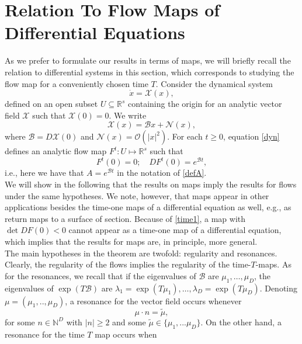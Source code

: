 \documentclass{amsart}
\theoremstyle{plain}
\theoremstyle{definition}
\begin{document}
\section{Relation To Flow Maps of Differential Equations}\label{sec_appendix}
As we prefer to formulate our results in terms of maps, we will briefly recall the relation to differential systems in this section, which corresponds to studying the flow map for a conveniently chosen time $T$. 
Consider the dynamical system
\begin{equation}\label{dynsyst}
\dot{x}=\mathcal{X}(x), 
\end{equation}
defined on an open subset $U\subseteq\mathbb{R}^s$ containing the origin for an analytic vector field $\mathcal{X}$ such that $\mathcal{X}(0)=0$. We write
\begin{equation}\label{dyn}
\mathcal{X}(x)=\mathcal{B}x+\mathcal{N}(x),
\end{equation}
where $\mathcal{B}=D\mathcal{X}(0)$ and $\mathcal{N}(x)=\mathcal{O}(|x|^2)$. For each $t\geq 0$, equation \eqref{dyn} defines an analytic flow map $F^t:U\mapsto \mathbb{R}^s$ such that
\begin{equation}\label{time1} 
 F^t(0) = 0; \quad DF^t(0)=e^{\mathcal{B}t},
\end{equation}
i.e., here we have that $A=e^{\mathcal{B}t}$ in the notation of \eqref{defA}.\\
We will show in the following that the results on maps imply the results for flows under the same hypotheses. We note, however, that maps appear in other applications besides the time-one maps of a differential equation as well, e.g., as return maps to a surface of section. Because of \eqref{time1}, a map with $\det DF(0) < 0$ cannot appear as a time-one map of a differential equation, which implies that the results for maps are, in principle, more general.\\
The main hypotheses in the theorem are twofold: regularity and resonances. Clearly, the regularity of the flows implies the regularity of the time-$T$-maps. As for the resonances, we recall that if  the eigenvalues of $\mathcal{B}$ are $\mu_1, \ldots, \mu_D$, the eigenvalues of $\exp( T \mathcal{B})$ are $\lambda_1 = \exp(T \mu_1), \ldots, \lambda_D = \exp(T\mu_D)$. Denoting $\mu=(\mu_1,..,\mu_D)$, a resonance for the vector field occurs whenever
\begin{equation} \label{flowresonance} 
\mu \cdot n  = \tilde \mu,  
\end{equation}
for some $n \in \mathbb{N}^D$ with $|n|\geq2$ and some $\tilde \mu\in \{\mu_1,...\mu_D\}$. On the other hand, a resonance for the time $T$ map occurs when 
\end{document}
